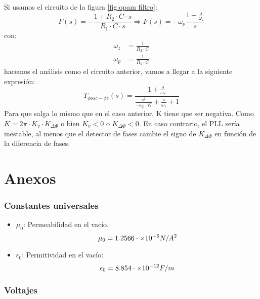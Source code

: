 \documentclass[
	12pt, %
	fleqn, %
	a4paper, %
	oneside, %
]{LegrandOrangeBook}
\begin{document}
Si usamos el circuito de la figura \ref{fig:opam filtro}:
\begin{displaymath}
F(s)=-\frac{1+R_2\cdot C\cdot s}{R_1\cdot C\cdot s}\Rightarrow F(s)=-\omega_p\frac{1+\frac{s}{\omega_z}}{s}
\end{displaymath}
con: 
\begin{align*}
\omega_z&=\frac{1}{R_2\cdot C}\\
\omega_p&=\frac{1}{R_1\cdot C}
\end{align*}
hacemos el análisis como el circuito anterior, vamos a llegar a la siguiente expresión:
\begin{displaymath}
T_{\phi osc-\phi e}(s)=\frac{1+\frac{s}{\omega_z}}{\frac{s^2}{-\omega_p\cdot K}+\frac{s}{\omega_z}+1}
\end{displaymath}
Para que salga lo mismo que en el caso anterior, K tiene que ser negativa. Como $K=2\pi\cdot K_v\cdot K_{\Delta\Phi}$ o bien $K_v<0$ o $K_{\Delta\Phi}<0$. En caso contrario, el PLL sería inestable, al menos que el detector de fases cambie el signo de $K_{\Delta\Phi}$ en función de la diferencia de fases.
\part{Anexos}
\stopcontents[part] %
\section{Constantes universales}
\begin{itemize}
\item $\mu_0$: Permeabilidad en el vacío.
\begin{displaymath}
\mu_0=1.2566\cdot\times 10^{-6} N/A^2
\end{displaymath}
\item $\epsilon_0$: Permitividad en el vacío:
\begin{displaymath}
\epsilon_0=8.854\cdot\times 10^{-12} F/m
\end{displaymath}
\end{itemize}
\section{Voltajes}
\end{document}
